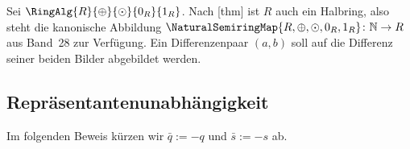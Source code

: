 \documentclass[main.tex]{subfiles}
\begin{document}
Sei \(\RingAlg{R}{\oplus}{\odot}{0_R}{1_R}\). Nach
[thm] ist \(R\) auch ein Halbring,
also steht die kanonische Abbildung
\(\NaturalSemiringMap{R,\oplus,\odot,0_R,1_R}\colon\mathbb N\to R\)
aus Band~28 zur Verfügung. Ein Differenzenpaar \((a,b)\) soll auf die
Differenz seiner beiden Bilder abgebildet werden.

\subsection{Repräsentantenunabhängigkeit}

Im folgenden Beweis kürzen wir
\(\bar q:=-q\) und \(\bar s:=-s\) ab.
\end{document}
